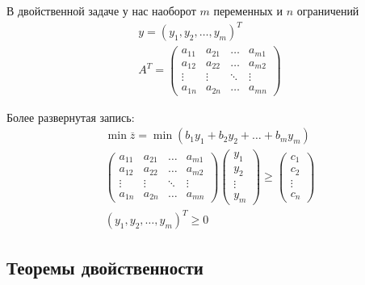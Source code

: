 \documentclass[a4paper,article,14pt]{extarticle}
\begin{document}
В двойственной задаче у нас наоборот \(m\) переменных и \(n\) ограничений
\begin{equation}
    \begin{gathered}
        y = (y_1, y_2, \ldots, y_m)^T \\
        A^T =
        \begin{pmatrix}
            a_{11} & a_{21} & \ldots & a_{m1} \\
            a_{12} & a_{22} & \ldots & a_{m2} \\
            \vdots & \vdots & \ddots & \vdots \\
            a_{1n} & a_{2n} & \ldots & a_{mn}
        \end{pmatrix}
    \end{gathered}
\end{equation}

Более развернутая запись:
\begin{equation}
    \begin{gathered}
        \min \overline z = \min (b_1y_1 + b_2y_2 + \ldots + b_my_m) \\
        \begin{pmatrix}
            a_{11} & a_{21} & \ldots & a_{m1} \\
            a_{12} & a_{22} & \ldots & a_{m2} \\
            \vdots & \vdots & \ddots & \vdots \\
            a_{1n} & a_{2n} & \ldots & a_{mn}
        \end{pmatrix}
        \begin{pmatrix}
            y_1 \\ y_2 \\ \vdots \\ y_m
        \end{pmatrix}
        \ge
        \begin{pmatrix}
            c_1 \\ c_2 \\ \vdots \\ c_n
        \end{pmatrix}
        \\
        (y_1, y_2, \ldots, y_m)^T \ge 0
    \end{gathered}
\end{equation}

\subsection{Теоремы двойственности}
\end{document}
